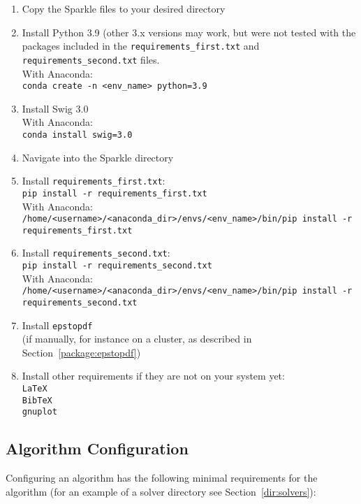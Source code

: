 \documentclass{article}
\begin{document}
\begin{enumerate}
  \item Copy the Sparkle files to your desired directory
  \item Install Python 3.9 (other 3.x versions may work, but were not tested with the packages included in the \texttt{requirements\_first.txt} and \texttt{requirements\_second.txt} files.\\
        With Anaconda:\\
        \texttt{conda create -n <env\_name> python=3.9}
  \item Install Swig 3.0\\
        With Anaconda:\\
        \texttt{conda install swig=3.0}
	\item Navigate into the Sparkle directory
  \item Install \texttt{requirements\_first.txt}:\\
        \texttt{pip install -r requirements\_first.txt}\\
        With Anaconda:\\
        \texttt{/home/<username>/<anaconda\_dir>/envs/<env\_name>/bin/pip install -r requirements\_first.txt}
  \item Install \texttt{requirements\_second.txt}:\\
        \texttt{pip install -r requirements\_second.txt}\\
        With Anaconda:\\
        \texttt{/home/<username>/<anaconda\_dir>/envs/<env\_name>/bin/pip install -r requirements\_second.txt}
  \item Install \texttt{epstopdf}\\
        (if manually, for instance on a cluster, as described in Section~\ref{package:epstopdf})
  \item Install other requirements if they are not on your system yet:\\
        \texttt{LaTeX}\\
        \texttt{BibTeX}\\
        \texttt{gnuplot}\\
\end{enumerate}

\subsection{Algorithm Configuration}
\label{quick:config_environment}

Configuring an algorithm has the following minimal requirements for the algorithm (for an example of a solver directory see Section~\ref{dir:solvers}):
\end{document}
